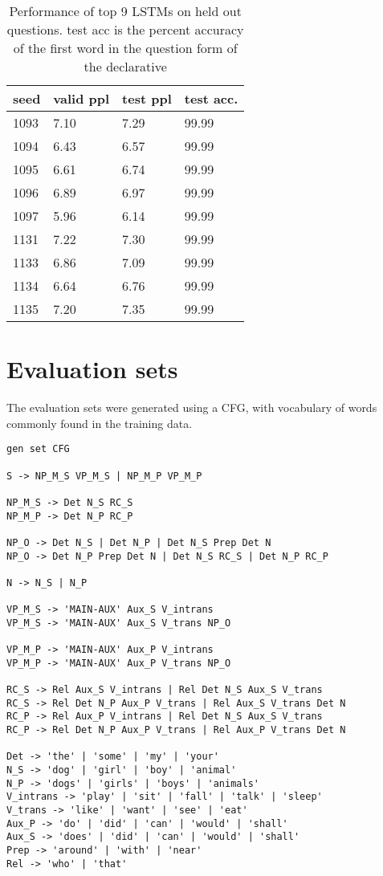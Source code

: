 \documentclass{article}
\begin{document}
\begin{table}[h!]
    \centering
\begin{tabular}{@{}llll@{}}
\toprule
seed & valid ppl & test ppl     & test acc.\\ \midrule
1093 & 7.10      & 7.29         & 99.99\\  
1094 & 6.43      & 6.57         & 99.99\\  
1095 & 6.61      & 6.74         & 99.99\\  
1096 & 6.89      & 6.97         & 99.99\\  
1097 & 5.96      & 6.14         & 99.99\\  
1131 & 7.22      & 7.30         & 99.99\\  
1133 & 6.86      & 7.09         & 99.99\\  
1134 & 6.64      & 6.76         & 99.99\\  
1135 & 7.20      & 7.35         & 99.99\\ \bottomrule
\end{tabular}
    \caption{Performance of top 9 LSTMs on held out questions. test acc is the percent accuracy of the first word in the question form of the declarative}
\label{tab:fine_tuning}
\end{table}

\section{Evaluation sets}

The evaluation sets were generated using a CFG, with vocabulary of words commonly found in the training data. 


\begin{verbatim}
gen set CFG

S -> NP_M_S VP_M_S | NP_M_P VP_M_P

NP_M_S -> Det N_S RC_S
NP_M_P -> Det N_P RC_P

NP_O -> Det N_S | Det N_P | Det N_S Prep Det N 
NP_O -> Det N_P Prep Det N | Det N_S RC_S | Det N_P RC_P

N -> N_S | N_P

VP_M_S -> 'MAIN-AUX' Aux_S V_intrans
VP_M_S -> 'MAIN-AUX' Aux_S V_trans NP_O

VP_M_P -> 'MAIN-AUX' Aux_P V_intrans
VP_M_P -> 'MAIN-AUX' Aux_P V_trans NP_O

RC_S -> Rel Aux_S V_intrans | Rel Det N_S Aux_S V_trans
RC_S -> Rel Det N_P Aux_P V_trans | Rel Aux_S V_trans Det N
RC_P -> Rel Aux_P V_intrans | Rel Det N_S Aux_S V_trans 
RC_P -> Rel Det N_P Aux_P V_trans | Rel Aux_P V_trans Det N

Det -> 'the' | 'some' | 'my' | 'your'
N_S -> 'dog' | 'girl' | 'boy' | 'animal'
N_P -> 'dogs' | 'girls' | 'boys' | 'animals'
V_intrans -> 'play' | 'sit' | 'fall' | 'talk' | 'sleep'
V_trans -> 'like' | 'want' | 'see' | 'eat'
Aux_P -> 'do' | 'did' | 'can' | 'would' | 'shall'
Aux_S -> 'does' | 'did' | 'can' | 'would' | 'shall'
Prep -> 'around' | 'with' | 'near'
Rel -> 'who' | 'that'

\end{verbatim}
\end{document}
